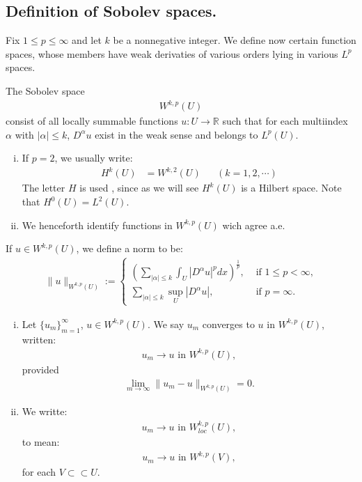 \subsection{Definition of Sobolev spaces.}
Fix $1\leq p\leq \infty$ and let $k$ be a nonnegative integer. We define now certain function spaces, whose members have weak derivaties of various orders lying in various $L^p$ spaces. 
\begin{definition}{The Sobolev space}
  \begin{align*}
    W^{k,p}(U)
  \end{align*}
  consist of all locally summable functions $u:U\to \mathbb{R}$ such that for each multiindex $\alpha$ with $|\alpha|\leq k$, $D^{\alpha}u$ exist in the weak sense and belongs to $L^{p}(U)$. 
\end{definition}
\begin{note}{}
  \begin{enumerate}[i)]
    \item If $p=2$, we usually write:
      \begin{align*}
        H^{k}(U)&=W^{k,2}(U) &&(k=1,2,\cdots)
      \end{align*}
      The letter $H$ is used , since as we will see $H^{k}(U)$ is a Hilbert space. Note that $H^{0}(U)=L^2(U)$.
    \item We henceforth identify functions in $W^{k,p}(U)$ wich agree a.e. 
  \end{enumerate}
\end{note}
\begin{definition}{}
  If $u\in W^{k,p}(U)$, we define a norm to be:
  \begin{align*}
    \|u\|_{W^{k,p}(U)}:= 
    \begin{cases}
      \left( \sum_{|\alpha|\leq k}\int_{U}|D^{\alpha}u|^{p}dx \right)^{\frac{1}{p}}, &\text{ if } 1\leq p<\infty \text{,} \\
      \sum_{|\alpha|\leq k}\sup_{U}|D^{\alpha}u|, &\text{ if } p=\infty .
    \end{cases}
  \end{align*}
\end{definition}
\begin{definition}{}
  \begin{enumerate}[i)]
    \item Let $\{u_m\}_{m=1}^{\infty}$, $u\in W^{k,p}(U)$. We say $u_m$ converges to $u$ in $W^{k,p}(U)$, written:
      \begin{align*}
        u_{m}\to u\text{ in }W^{k,p}(U),
      \end{align*}  
      provided
      \begin{align*}
        \lim_{m \to \infty}\|u_{m}-u\|_{W^{k,p}(U)}=0.
      \end{align*}
    \item We writte:
      \begin{align*}
        u_m\to u\text{ in }W^{k,p}_{loc}(U),
      \end{align*}
      to mean:
      \begin{align*}
        u_m\to u\text{ in }W^{k,p}(V),
      \end{align*}
      for each $V\subset \subset U$.
  \end{enumerate}
\end{definition}
